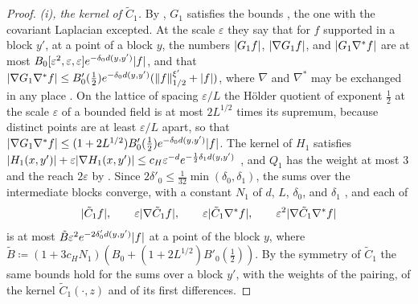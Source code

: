 \documentclass[11pt]{preprint}
\DeclarePairedDelimiter{\abs}{\lvert}{\rvert}
\DeclarePairedDelimiter{\norm}{\lVert}{\rVert}
\numberwithin{equation}{section}
\theoremstyle{definition}
\theoremstyle{remark}
\theoremstyle{plain}
\begin{document}
\begin{proof}
\emph{(i), the kernel of $\tilde C_1$.} By \cite[Theorem~3.12, p.~423]{BalabanPBG}, $G_1$ satisfies the bounds \cite[(3.42)--(3.44)]{BalabanPBG}, the one with the covariant Laplacian excepted. At the scale $\varepsilon$ they say that for $f$ supported in a block $y'$, at a point of a block $y$, the numbers $\abs{G_1f}$, $\abs{\nabla G_1f}$, and $\abs{G_1\nabla^*f}$ are at most $B_0[\varepsilon^2, \varepsilon, \varepsilon]e^{-\delta_0d(y,y')}\abs f$, and that $\abs{\nabla G_1\nabla^*f} \leq B'_0(\frac12)e^{-\delta_0d(y,y')}(\norm f^{\xi'}_{1/2} + \abs f)$, where $\nabla$ and $\nabla^*$ may be exchanged in any place \cite[p.~398]{BalabanPBG}. On the lattice of spacing $\varepsilon/L$ the H\"older quotient of exponent $\frac12$ at the scale $\varepsilon$ of a bounded field is at most $2L^{1/2}$ times its supremum, because distinct points are at least $\varepsilon/L$ apart, so that $\abs{\nabla G_1\nabla^*f} \leq (1 + 2L^{1/2})B'_0(\frac12)e^{-\delta_0d(y,y')}\abs f$. The kernel of $H_1$ satisfies $\abs{H_1(x, y')} + \varepsilon\abs{\nabla H_1(x, y')} \leq c_H\varepsilon^{-d}e^{-\frac12\delta_1d(y,y')}$ \cite[(3.133)]{BalabanPBG}, and $Q_1$ has the weight at most $3$ and the reach $2\varepsilon$ by \cite[(124)]{BalabanAVG}. Since $2\delta'_0 \leq \frac{1}{32}\min(\delta_0, \delta_1)$, the sums over the intermediate blocks converge, with a constant $N_1$ of $d$, $L$, $\delta_0$, and $\delta_1$ \cite[(2.58)]{BalabanPRT2}, and each of
\begin{equation}\label{eq:fluctuation-kernel}
    \abs{\tilde C_1f},\qquad \varepsilon\abs{\nabla\tilde C_1f},\qquad \varepsilon\abs{\tilde C_1\nabla^*f},\qquad \varepsilon^2\abs{\nabla\tilde C_1\nabla^*f}
\end{equation}
is at most $\tilde B\varepsilon^2e^{-2\delta'_0d(y,y')}\abs f$ at a point of the block $y$, where $\tilde B \coloneqq (1 + 3c_HN_1)(B_0 + (1 + 2L^{1/2})B'_0(\frac12))$. By the symmetry of $\tilde C_1$ the same bounds hold for the sums over a block $y'$, with the weights of the pairing, of the kernel $\tilde C_1(\cdot, z)$ and of its first differences.


\end{proof}
\end{document}
